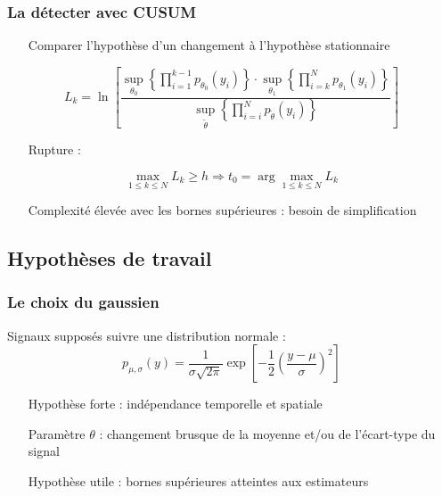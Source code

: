 \documentclass{beamer}
\begin{document}
\begin{frame}
	\frametitle{La détecter avec CUSUM}
	\begin{itemize}

		\item[Comparer] l'hypothèse d'un changement à l'hypothèse stationnaire
	\end{itemize}
	\begin{equation}
		L _k =\ln \left[ \frac{\sup_{\theta_0}\left\{ \prod_{i=1}^{k-1} p_{\theta_0}(y_i) \right\} \cdot \sup_{\theta_1} \left\{ \prod_{i = k}^{N}p_{\theta_1}(y_i) \right\}}{\sup_{\tilde\theta}\left\{\prod_{i=i}^{N}p_{\tilde{\theta}}(y_i)\right\}} \right]
	\end{equation}
	\begin{itemize}
		\item[Rupture]:
	\end{itemize}
	\begin{equation}
		\max_{1 \leq k \leq N} L_k \geq h \Rightarrow t_0 = \arg \max_{1 \leq k \leq N} L_k
	\end{equation}
	\begin{itemize}
		\item[Complexité] élevée avec les bornes supérieures : besoin de simplification
	\end{itemize}
\end{frame}

\subsection{Hypothèses de travail}

\begin{frame}
	\frametitle{Le choix du gaussien}
	Signaux supposés suivre une distribution normale :
	\begin{equation}
		p_{\mu, \sigma}(y) = \frac1{\sigma\sqrt{2 \pi}} \exp \left[ -\frac12 \left( \frac{y - \mu}{\sigma} \right)^2 \right]
	\end{equation}
	\begin{itemize}
		\item[Hypothèse] forte : indépendance temporelle et spatiale
		\item[Paramètre] $\theta$ : changement brusque de la moyenne et/ou de l'écart-type du signal
		\item[Hypothèse] utile : bornes supérieures atteintes aux estimateurs
	\end{itemize}
\end{frame}
\end{document}
